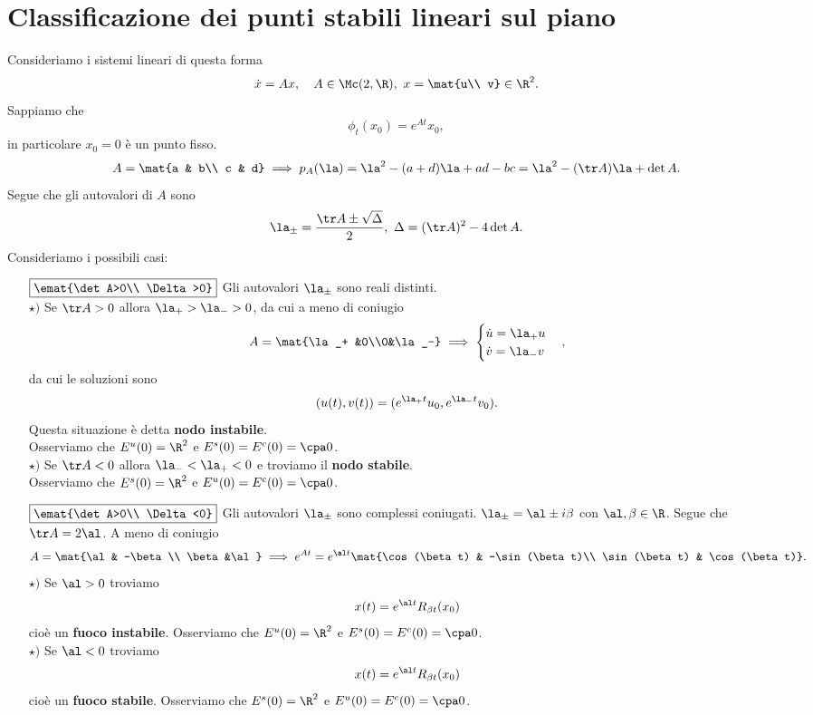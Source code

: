 \section{Classificazione dei punti stabili lineari sul piano}
Consideriamo i sistemi lineari di questa forma
\[\dot x=Ax,\quad A\in\Mc(2,\R),\ x=\mat{u\\ v}\in\R^2.\]
Sappiamo che
\[\phi_t(x_0)=e^{At}x_0,\]
in particolare $x_0=0$ \`e un punto fisso.
\[A=\mat{a & b\\ c & d}\implies p_A(\la)=\la^2-(a+d)\la+ad-bc=\la^2-(\tr A)\la+\det A.\]
Segue che gli autovalori di $A$ sono
\[\la_{\pm}=\frac{\tr A\pm \sqrt{\Delta}}{2},\ \Delta=(\tr A)^2-4\det A.\]
Consideriamo i possibili casi:
\setlength{\leftmargini}{0cm}
\begin{itemize}
\item[$\boxed{\emat{\det A>0\\ \Delta>0}}$] Gli autovalori $\la_\pm$ sono reali distinti.\\
$\star)$ Se $\tr A>0$ allora $\la_+>\la_->0$, da cui a meno di coniugio
\[A=\mat{\la_+ &0\\0&\la_-}\implies \begin{cases}
\dot u=\la_+ u\\
\dot v=\la_- v
\end{cases},\]
da cui le soluzioni sono
\[(u(t), v(t))=(e^{\la_+t}u_0, e^{\la_-t}v_0).\]
Questa situazione \`e detta \textbf{nodo instabile}.\\ Osserviamo che $E^u(0)=\R^2$ e $E^s(0)=E^c(0)=\cpa0$.\\
$\star)$ Se $\tr A<0$ allora $\la_-<\la_+<0$ e troviamo il \textbf{nodo stabile}.\\ Osserviamo che $E^s(0)=\R^2$ e $E^u(0)=E^c(0)=\cpa0$.
\item[$\boxed{\emat{\det A>0\\ \Delta<0}}$] Gli autovalori $\la_\pm$ sono complessi coniugati. $\la_\pm=\al\pm i\beta$ con $\al,\beta\in\R$. Segue che $\tr A=2\al$. A meno di coniugio
\[A=\mat{\al & -\beta\\ \beta &\al}\implies e^{At}=e^{\al t}\mat{\cos(\beta t) & -\sin(\beta t)\\ \sin(\beta t) & \cos(\beta t)}.\]
$\star)$ Se $\al>0$ troviamo
\[x(t)=e^{\al t} R_{\beta t}(x_0)\]
cio\`e un \textbf{fuoco instabile}. Osserviamo che $E^u(0)=\R^2$ e $E^s(0)=E^c(0)=\cpa0$.\\
$\star)$ Se $\al<0$ troviamo
\[x(t)=e^{\al t} R_{\beta t}(x_0)\]
cio\`e un \textbf{fuoco stabile}. Osserviamo che $E^s(0)=\R^2$ e $E^u(0)=E^c(0)=\cpa0$.\\

\end{itemize}
